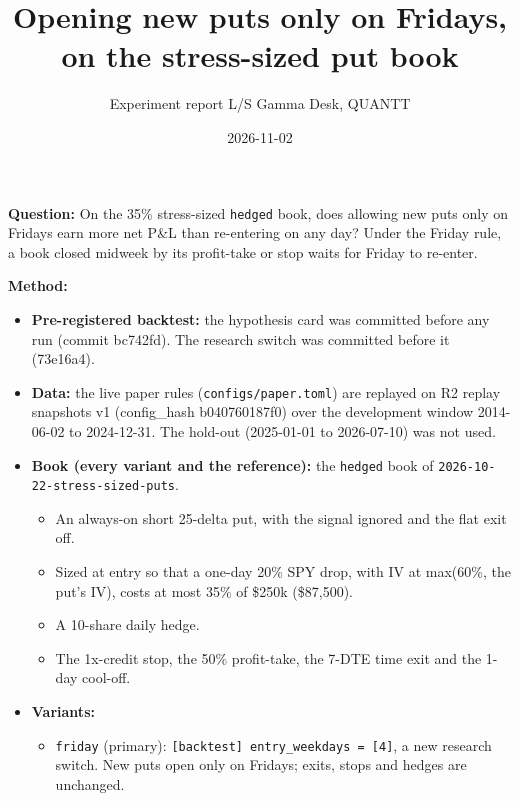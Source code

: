 \documentclass{article}
\title{Opening new puts only on Fridays, on the stress-sized put book}
\author{Experiment report \textperiodcentered{} L/S Gamma Desk, QUANTT}
\date{2026-11-02}
\begin{document}
\maketitle

\textbf{Question:} On the 35\% stress-sized \texttt{hedged} book, does allowing new puts only on Fridays earn more net P\&L than re-entering on any day? Under the Friday rule, a book closed midweek by its profit-take or stop waits for Friday to re-enter.

\textbf{Method:}

\begin{itemize}

\item \textbf{Pre-registered backtest:} the hypothesis card was committed before any run (commit bc742fd). The research switch was committed before it (73e16a4).

\item \textbf{Data:} the live paper rules (\texttt{configs/\allowbreak{}paper.\allowbreak{}toml}) are replayed on R2 replay snapshots v1 (config\_hash b040760187f0) over the development window 2014-06-02 to 2024-12-31. The hold-out (2025-01-01 to 2026-07-10) was not used.

\item \textbf{Book (every variant and the reference):} the \texttt{hedged} book of \texttt{2026-\allowbreak{}10-\allowbreak{}22-\allowbreak{}stress-\allowbreak{}sized-\allowbreak{}puts}.

\begin{itemize}

\item An always-on short 25-delta put, with the signal ignored and the flat exit off.

\item Sized at entry so that a one-day 20\% SPY drop, with IV at max(60\%, the put's IV), costs at most 35\% of \$250k (\$87,500).

\item A 10-share daily hedge.

\item The 1x-credit stop, the 50\% profit-take, the 7-DTE time exit and the 1-day cool-off.

\end{itemize}

\item \textbf{Variants:}

\begin{itemize}

\item \texttt{friday} (primary): \texttt{[backtest] entry\_\allowbreak{}weekdays = [4]}, a new research switch. New puts open only on Fridays; exits, stops and hedges are unchanged.


\end{itemize}
\end{itemize}
\end{document}

